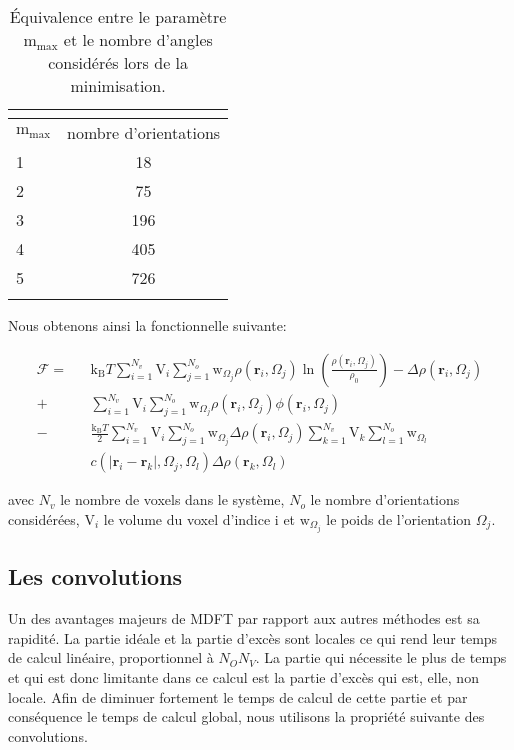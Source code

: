 \begin{table}[H]
 \centering
  \begin{tabular}{l | c }
    \hline \multicolumn{2}{c}{} \\[-1em]\hline
    $\mathrm{m}_\mathrm{max}$ & nombre d'orientations \\
    \hline
    1  & 18 \\
    2  & 75 \\
    3  & 196 \\
    4  & 405 \\
    5  & 726 \\
    \hline \multicolumn{2}{c}{} \\[-1em]\hline
  \end{tabular}
  \caption[\'Equivalence entre le paramètre $\mathrm{m}_\mathrm{max}$ et le nombre d'angles.]{\'Equivalence entre le paramètre $\mathrm{m}_\mathrm{max}$ et le nombre d'angles considérés lors de la minimisation.}
  \label{tab:mmax}  
\end{table}


Nous obtenons ainsi la fonctionnelle suivante:



\begin{eqnarray}
\mathcal{F} =& &\mathrm{k_B}T \sum\limits_{i=1}^{N_v}\mathrm{V}_i\sum\limits_{j=1}^{N_o}\mathrm{w}_{\Omega_j} \rho\left(\boldsymbol{r}_i,\Omega_j\right)\ln\left(\frac{\rho\left(\boldsymbol{r}_i,\Omega_j\right)}{\rho_0}\right)-\Delta\rho\left(\boldsymbol{r}_i,\Omega_j\right)\\
			+& &\sum\limits_{i=1}^{N_v}\mathrm{V}_i\sum\limits_{j=1}^{N_o}\mathrm{w}_{\Omega_j} \rho\left(\boldsymbol{r}_i,\Omega_j\right)\phi\left(\boldsymbol{r}_i,\Omega_j\right)\\
            -& &\frac{\mathrm{k_B}T}{2}\sum\limits_{i=1}^{N_v}\mathrm{V}_i\sum\limits_{j=1}^{N_o}\mathrm{w}_{\Omega_j} \Delta\rho\left(\boldsymbol{r}_i,\Omega_j\right) \sum\limits_{k=1}^{N_v}\mathrm{V}_k\sum\limits_{l=1}^{N_o} \mathrm{w}_{\Omega_l}\\
            & &c\left(\left|\boldsymbol{r}_i-\boldsymbol{r}_k\right|,\Omega_j,\Omega_l \right) \Delta\rho\left(\boldsymbol{r}_k,\Omega_l\right) \nonumber 
\end{eqnarray}


\noindent avec $N_v$ le nombre de voxels dans le système, $N_o$ le nombre d'orientations considérées, $\mathrm{V}_i$ le volume du voxel d'indice i et $\mathrm{w}_{\Omega_j}$ le poids de l'orientation $\Omega_j$.


\subsection{Les convolutions}
Un des avantages majeurs de MDFT par rapport aux autres méthodes est sa rapidité. La partie idéale et la partie d'excès sont locales ce qui rend leur temps de calcul linéaire, proportionnel à $N_O N_V$. La partie qui nécessite le plus de temps et qui est donc limitante dans ce calcul est la partie d'excès qui est, elle, non locale. Afin de diminuer fortement le temps de calcul de cette partie et par conséquence le temps de calcul global, nous utilisons la propriété suivante des convolutions.

